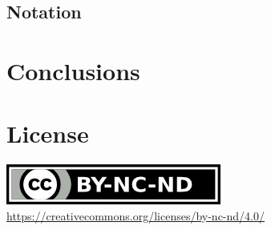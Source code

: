 \documentclass[sigconf, screen]{acmart}
\begin{document}
\subsection{Notation}
\label{ss:notation}













\section{Conclusions}	%
\label{s:conclusions}




\section*{License}
\label{s:license}
\begin{center}
	\includegraphics{by-nc-nd.png} \\
	\url{https://creativecommons.org/licenses/by-nc-nd/4.0/}
\end{center}
\end{document}
